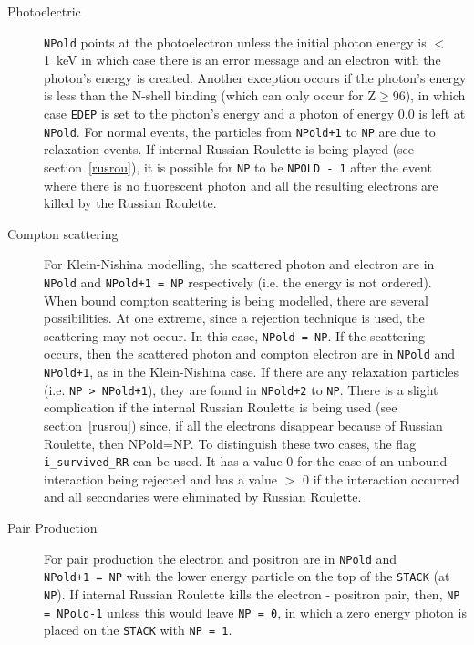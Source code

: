 \begin{description}

\item[Photoelectric] {\tt NPold} points at the photoelectron unless the initial
photon energy is $<$1~keV in which case there is an error message and an
electron with the photon's energy is created. Another exception occurs if
the photon's energy is less than the N-shell binding (which can only occur
for Z$\ge$96), in which case {\tt EDEP} is set to the photon's energy and a
photon of energy 0.0 is left at {\tt NPold}.  For normal events, the
particles from \verb^NPold+1^ to {\tt NP} are due to relaxation events.  If
internal Russian Roulette is being played (see section~\ref{rusrou}), it is
possible for {\tt NP} to be {\tt NPOLD - 1} after the event where there is
no fluorescent photon and all the resulting electrons are killed by the
Russian Roulette.  

\item[Compton scattering] For Klein-Nishina modelling, the scattered photon and
electron are in {\tt NPold} and \verb^NPold+1 = NP^ respectively (i.e. the energy is not
ordered).  When bound compton scattering is
being modelled, there are several possibilities. At one extreme, since a
rejection technique is used, the scattering may not occur. In this case,
\verb^NPold = NP^.  If the scattering occurs, then the scattered photon and
compton electron are in \verb^NPold^ and \verb^NPold+1^, as in the Klein-Nishina case. If
there are any relaxation particles (i.e. \verb^NP > NPold+1^), they are found
in \verb^NPold+2^ to \verb^NP^.  There is a slight complication if the internal Russian
Roulette is being used (see section~\ref{rusrou})
since, if all the electrons disappear because of Russian Roulette, then
NPold=NP. To distinguish these two cases, the flag {\tt i\_survived\_RR}
can be used. It has a value 0 for the case of an unbound interaction being
rejected and has a value $>$ 0 if the interaction occurred and all
secondaries were eliminated by Russian Roulette.

\item[Pair Production] For pair production the electron and positron are
in {\tt NPold} and\\ \verb^NPold+1 = NP^ with the lower energy particle on the
top of the {\tt STACK} (at \verb^NP^). If internal Russian Roulette kills
the electron - positron pair, then,
\verb^NP = NPold-1^ unless this would leave \verb^NP = 0^, in which a
zero energy photon is placed on the {\tt STACK} with \verb^NP = 1^.


\end{description}
